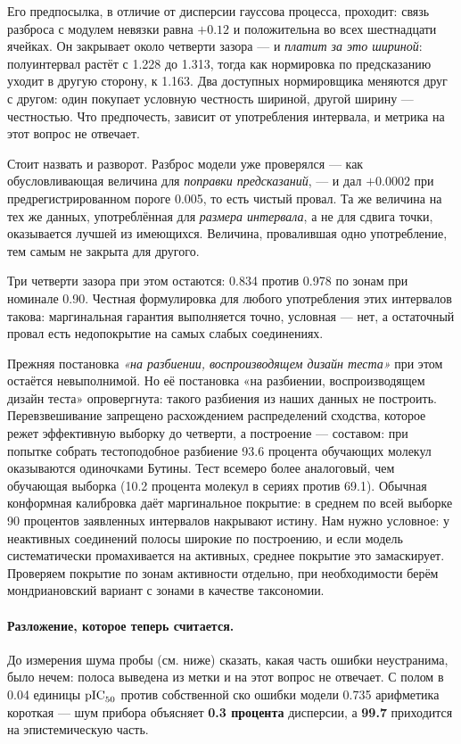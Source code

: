 Его предпосылка, в отличие от дисперсии гауссова процесса, проходит: связь разброса с модулем
невязки равна $+0.12$ и положительна во всех шестнадцати ячейках. Он закрывает около четверти
зазора --- и \emph{платит за это шириной}: полуинтервал растёт с 1.228 до 1.313, тогда как
нормировка по предсказанию уходит в другую сторону, к 1.163. Два доступных нормировщика меняются
друг с другом: один покупает условную честность шириной, другой ширину --- честностью. Что
предпочесть, зависит от употребления интервала, и метрика на этот вопрос не отвечает.

Стоит назвать и разворот. Разброс модели уже проверялся --- как обусловливающая величина для
\emph{поправки предсказаний}, --- и дал $+0.0002$ при предрегистрированном пороге 0.005, то есть
чистый провал. Та же величина на тех же данных, употреблённая для \emph{размера интервала}, а не
для сдвига точки, оказывается лучшей из имеющихся. Величина, провалившая одно употребление, тем
самым не закрыта для другого.

Три четверти зазора при этом остаются: 0.834 против 0.978 по зонам при номинале 0.90. Честная
формулировка для любого употребления этих интервалов такова: маргинальная гарантия выполняется
точно, условная --- нет, а остаточный провал есть недопокрытие на самых слабых соединениях.

Прежняя постановка \emph{«на разбиении, воспроизводящем дизайн теста»} при этом остаётся
невыполнимой. Но её постановка «на
разбиении, воспроизводящем дизайн теста» опровергнута: такого разбиения из наших данных не построить.
Перевзвешивание запрещено расхождением распределений сходства, которое режет эффективную выборку до
четверти, а построение --- составом: при попытке собрать тестоподобное разбиение 93.6 процента
обучающих молекул оказываются одиночками Бутины. Тест всемеро более аналоговый, чем обучающая выборка
(10.2 процента молекул в сериях против 69.1). Обычная конформная калибровка
даёт маргинальное покрытие: в среднем по всей выборке 90 процентов заявленных интервалов накрывают истину.
Нам нужно условное: у неактивных соединений полосы широкие по построению, и если модель систематически
промахивается на активных, среднее покрытие это замаскирует. Проверяем покрытие по зонам активности
отдельно, при необходимости берём мондриановский вариант с зонами в качестве таксономии.

\paragraph{Разложение, которое теперь считается.} До измерения шума пробы (см. ниже) сказать, какая
часть ошибки неустранима, было нечем: полоса выведена из метки и на этот вопрос не отвечает. С полом
в 0.04 единицы $\mathrm{pIC}_{50}$ против собственной ско ошибки модели 0.735 арифметика короткая --- шум прибора
объясняет \textbf{0.3 процента} дисперсии, а \textbf{99.7} приходится на эпистемическую часть.

